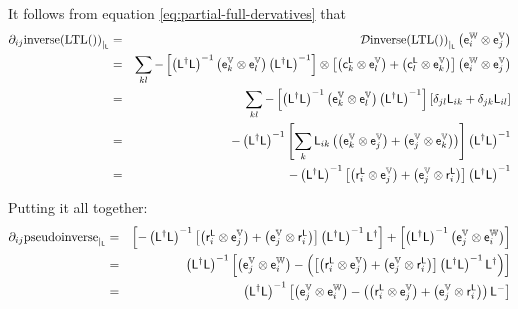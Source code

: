 It follows from equation \ref{eq:partial-full-dervatives} that
\begin{eqnarray}
{\partial}_{ij}{\mathrm{inverse}(\mathrm{LTL}())}_{\mid_{\mathsf{L}}}
& = &
{\mathcal{D}{\mathrm{inverse}(\mathrm{LTL}())}_{\mid_{\mathsf{L}}}}
\left( \mathsf{e}_i^{\mathbb{W}} \otimes \mathsf{e}_j^{\mathbb{V}} \right)
\\
& = &
\sum_{kl}
- \left[
\left( \mathsf{L}^{\dagger} \mathsf{L} \right)^{-1}
\left( \mathsf{e}_k^{\mathbb{V}} \otimes \mathsf{e}_l^{\mathbb{V}} \right)
\left( \mathsf{L}^{\dagger} \mathsf{L} \right)^{-1}
\right]
\otimes
\left[
\left( \mathsf{c}_k^{\mathsf{L}} \otimes \mathsf{e}_l^{\mathbb{V}} \right)
+
\left( \mathsf{c}_l^{\mathsf{L}} \otimes \mathsf{e}_k^{\mathbb{V}} \right)
\right]
\left( \mathsf{e}_i^{\mathbb{W}} \otimes \mathsf{e}_j^{\mathbb{V}} \right)
\nonumber
\\
& = &
\sum_{kl}
- \left[
\left( \mathsf{L}^{\dagger} \mathsf{L} \right)^{-1}
\left( \mathsf{e}_k^{\mathbb{V}} \otimes \mathsf{e}_l^{\mathbb{V}} \right)
\left( \mathsf{L}^{\dagger} \mathsf{L} \right)^{-1}
\right]
\left[
\delta_{jl}
\mathsf{L}_{ik}
+
\delta_{jk}
\mathsf{L}_{il}
\right]
\nonumber
\\
& = &
-
\left( \mathsf{L}^{\dagger} \mathsf{L} \right)^{-1}
\left[
\sum_{k}
\mathsf{L}_{ik}
\left(
\left( \mathsf{e}_k^{\mathbb{V}} \otimes \mathsf{e}_j^{\mathbb{V}} \right)
+
\left( \mathsf{e}_j^{\mathbb{V}} \otimes \mathsf{e}_k^{\mathbb{V}} \right)
\right)
\right]
\left( \mathsf{L}^{\dagger} \mathsf{L} \right)^{-1}
\nonumber
\\
& = &
-
\left( \mathsf{L}^{\dagger} \mathsf{L} \right)^{-1}
\left[
\left( \mathsf{r}_i^{\mathsf{L}} \otimes \mathsf{e}_j^{\mathbb{V}} \right)
+
\left( \mathsf{e}_j^{\mathbb{V}} \otimes \mathsf{r}_i^{\mathsf{L}} \right)
\right]
\left( \mathsf{L}^{\dagger} \mathsf{L} \right)^{-1}
\nonumber
\end{eqnarray}

Putting it all together:
\begin{eqnarray}
{\partial}_{ij}{\mathrm{pseudoinverse}}_{\mid_{\mathsf{L}}}
& = &
\left[
-
\left( \mathsf{L}^{\dagger} \mathsf{L} \right)^{-1}
\left[
\left( \mathsf{r}_i^{\mathsf{L}} \otimes \mathsf{e}_j^{\mathbb{V}} \right)
+
\left( \mathsf{e}_j^{\mathbb{V}} \otimes \mathsf{r}_i^{\mathsf{L}} \right)
\right]
\left( \mathsf{L}^{\dagger} \mathsf{L} \right)^{-1}
\mathsf{L}^{\dagger}
\right]
+
\left[
\left( \mathsf{L}^{\dagger} \mathsf{L} \right)^{-1}
\left( \mathsf{e}_j^{\mathbb{V}} \otimes \mathsf{e}_i^{\mathbb{W}} \right)
\right]
\nonumber
\\
& = &
\left( \mathsf{L}^{\dagger} \mathsf{L} \right)^{-1}
\left[
\left( \mathsf{e}_j^{\mathbb{V}} \otimes \mathsf{e}_i^{\mathbb{W}} \right)
-
\left(
\left[
\left( \mathsf{r}_i^{\mathsf{L}} \otimes \mathsf{e}_j^{\mathbb{V}} \right)
+
\left( \mathsf{e}_j^{\mathbb{V}} \otimes \mathsf{r}_i^{\mathsf{L}} \right)
\right]
\left( \mathsf{L}^{\dagger} \mathsf{L} \right)^{-1}
\mathsf{L}^{\dagger}
\right)
\right]
\nonumber
\\
& = &
\left( \mathsf{L}^{\dagger} \mathsf{L} \right)^{-1}
\left[
\left( \mathsf{e}_j^{\mathbb{V}} \otimes \mathsf{e}_i^{\mathbb{W}} \right)
-
\left(
\left( \mathsf{r}_i^{\mathsf{L}} \otimes \mathsf{e}_j^{\mathbb{V}} \right)
+
\left( \mathsf{e}_j^{\mathbb{V}} \otimes \mathsf{r}_i^{\mathsf{L}} \right)
\right)
\mathsf{L}^{-}
\right]
\end{eqnarray}

\restoregeometry


